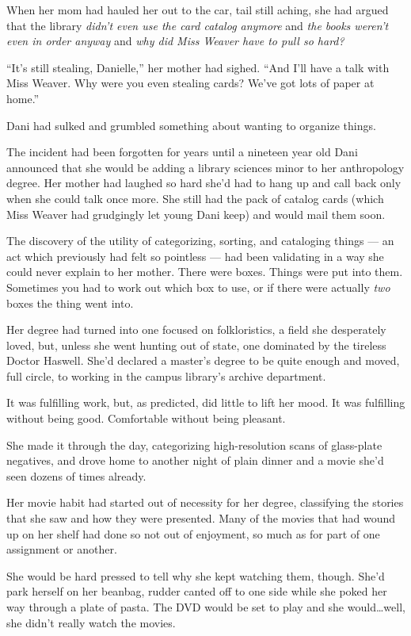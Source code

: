 When her mom had hauled her out to the car, tail still aching, she had argued that the library \emph{didn't even use the card catalog anymore} and \emph{the books weren't even in order anyway} and \emph{why did Miss Weaver have to pull so hard?}

``It's still stealing, Danielle,'' her mother had sighed. ``And I'll have a talk with Miss Weaver. Why were you even stealing cards? We've got lots of paper at home.''

Dani had sulked and grumbled something about wanting to organize things.

The incident had been forgotten for years until a nineteen year old Dani announced that she would be adding a library sciences minor to her anthropology degree. Her mother had laughed so hard she'd had to hang up and call back only when she could talk once more. She still had the pack of catalog cards (which Miss Weaver had grudgingly let young Dani keep) and would mail them soon.

The discovery of the utility of categorizing, sorting, and cataloging things --- an act which previously had felt so pointless --- had been validating in a way she could never explain to her mother. There were boxes. Things were put into them. Sometimes you had to work out which box to use, or if there were actually \emph{two} boxes the thing went into.

Her degree had turned into one focused on folkloristics, a field she desperately loved, but, unless she went hunting out of state, one dominated by the tireless Doctor Haswell. She'd declared a master's degree to be quite enough and moved, full circle, to working in the campus library's archive department.

It was fulfilling work, but, as predicted, did little to lift her mood. It was fulfilling without being good. Comfortable without being pleasant.

She made it through the day, categorizing high-resolution scans of glass-plate negatives, and drove home to another night of plain dinner and a movie she'd seen dozens of times already.

Her movie habit had started out of necessity for her degree, classifying the stories that she saw and how they were presented. Many of the movies that had wound up on her shelf had done so not out of enjoyment, so much as for part of one assignment or another.

She would be hard pressed to tell why she kept watching them, though. She'd park herself on her beanbag, rudder canted off to one side while she poked her way through a plate of pasta. The DVD would be set to play and she would\ldots{}well, she didn't really watch the movies.

